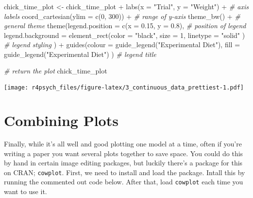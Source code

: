 \documentclass[
]{book}
\newenvironment{Shaded}{\begin{snugshade}}{\end{snugshade}}
\newcommand{\AttributeTok}[1]{\textcolor[rgb]{0.77,0.63,0.00}{#1}}
\newcommand{\CommentTok}[1]{\textcolor[rgb]{0.56,0.35,0.01}{\textit{#1}}}
\newcommand{\DecValTok}[1]{\textcolor[rgb]{0.00,0.00,0.81}{#1}}
\newcommand{\FloatTok}[1]{\textcolor[rgb]{0.00,0.00,0.81}{#1}}
\newcommand{\FunctionTok}[1]{\textcolor[rgb]{0.00,0.00,0.00}{#1}}
\newcommand{\NormalTok}[1]{#1}
\newcommand{\OtherTok}[1]{\textcolor[rgb]{0.56,0.35,0.01}{#1}}
\newcommand{\SpecialCharTok}[1]{\textcolor[rgb]{0.00,0.00,0.00}{#1}}
\newcommand{\StringTok}[1]{\textcolor[rgb]{0.31,0.60,0.02}{#1}}
\begin{document}
\begin{Shaded}
\begin{Highlighting}[]
\NormalTok{chick\_time\_plot }\OtherTok{\textless{}{-}}\NormalTok{ chick\_time\_plot }\SpecialCharTok{+}
  \FunctionTok{labs}\NormalTok{(}\AttributeTok{x =} \StringTok{"Trial"}\NormalTok{, }\AttributeTok{y =} \StringTok{"Weight"}\NormalTok{) }\SpecialCharTok{+} \CommentTok{\# axis labels}
  \FunctionTok{coord\_cartesian}\NormalTok{(}\AttributeTok{ylim =} \FunctionTok{c}\NormalTok{(}\DecValTok{0}\NormalTok{, }\DecValTok{300}\NormalTok{)) }\SpecialCharTok{+} \CommentTok{\# range of y{-}axis}
  \FunctionTok{theme\_bw}\NormalTok{() }\SpecialCharTok{+} \CommentTok{\# general theme}
  \FunctionTok{theme}\NormalTok{(}\AttributeTok{legend.position =} \FunctionTok{c}\NormalTok{(}\AttributeTok{x =} \FloatTok{0.15}\NormalTok{, }\AttributeTok{y =} \FloatTok{0.8}\NormalTok{), }\CommentTok{\# position of legend}
        \AttributeTok{legend.background =} \FunctionTok{element\_rect}\NormalTok{(}\AttributeTok{color =} \StringTok{"black"}\NormalTok{,}
                                         \AttributeTok{size =} \DecValTok{1}\NormalTok{,}
                                         \AttributeTok{linetype =} \StringTok{"solid"}
\NormalTok{                                         ) }\CommentTok{\# legend styling}
\NormalTok{  ) }\SpecialCharTok{+}
  \FunctionTok{guides}\NormalTok{(}\AttributeTok{colour =} \FunctionTok{guide\_legend}\NormalTok{(}\StringTok{"Experimental Diet"}\NormalTok{),}
         \AttributeTok{fill =} \FunctionTok{guide\_legend}\NormalTok{(}\StringTok{"Experimental Diet"}\NormalTok{)}
\NormalTok{         ) }\CommentTok{\# legend title}

\CommentTok{\# return the plot}
\NormalTok{chick\_time\_plot}
\end{Highlighting}
\end{Shaded}

\texttt{[image: r4psych\_files/figure-latex/3\_continuous\_data\_prettiest-1.pdf]}

\hypertarget{combining-plots}{%
\section{Combining Plots}\label{combining-plots}}

Finally, while it's all well and good plotting one model at a time, often if you're writing a paper you want several plots together to save space. You could do this by hand in certain image editing packages, but luckily there's a package for this on CRAN; \texttt{cowplot}. First, we need to install and load the package. Intall this by running the commented out code below. After that, load \texttt{cowplot} each time you want to use it.
\end{document}
